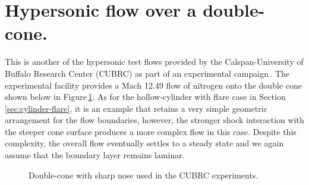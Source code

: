 
\section{Hypersonic flow over a double-cone.}
\label{sec:double-cone-sharp-nose}
%
This is another of the hypersonic test flows provided by the Calspan-University of Buffalo Research Center (CUBRC)
as part of an experimental campaign\,\cite{holden_etal_2002a,holden_wadhams_2003a}.
The experimental facility provides a Mach 12.49 flow of nitrogen onto the double cone shown below 
in Figure\,\ref{fig:double-cone-sharp-nose-model}.
As for the hollow-cylinder with flare case in Section\,\ref{sec:cylinder-flare}, 
it is an example that retains a very simple geometric arrangement for the flow boundaries, however, 
the stronger shock interaction with the steeper cone surface produces a more complex flow in this case.
Despite this complexity, the overall flow eventually settles to a steady state and 
we again assume that the boundary layer remains laminar.

\begin{figure}[htbp]
 \centering
 \caption{Double-cone with sharp nose used in the CUBRC experiments.}
 \label{fig:double-cone-sharp-nose-model}
\end{figure}

